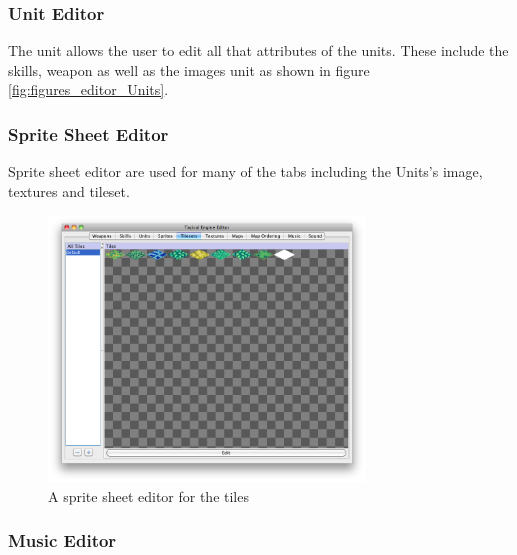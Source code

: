\subsubsection{Unit Editor}
\label{ssub:unit_editors}
The unit allows the user to edit all that attributes of the units. These include the skills, weapon as well as the images unit as shown in figure \ref{fig:figures_editor_Units}. 


\subsubsection{Sprite Sheet Editor}
Sprite sheet editor are used for many of the tabs including the Units's image, textures and tileset.
\begin{figure}[htbp]
	\centering
		\includegraphics[width=0.75\textwidth]{figures/editor/tileset_edit.png}
	\caption{A sprite sheet  editor for the tiles}
	\label{fig:figures_editor_tileset_edit}
\end{figure}

\subsubsection{Music Editor}
\label{ssub:music_editor}


